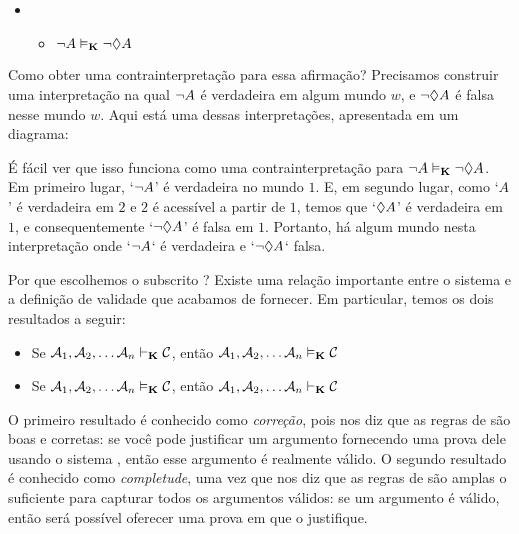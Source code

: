 \begin{itemize}
	\item[]
	      \begin{itemize}
		      \item[]$\neg A\vDash_{\mathbf{K}} \neg \Diamond A$
	      \end{itemize}
\end{itemize}
Como obter uma contrainterpretação para essa afirmação? Precisamos construir uma interpretação na qual $\neg A$ é verdadeira em algum mundo $w$, e $\neg\Diamond A$ é falsa   nesse mundo $w$. Aqui está uma dessas interpretações, apresentada em um diagrama:
\begin{center}
\end{center}
É fácil ver que isso funciona como uma contrainterpretação para  $\neg A\vDash_{\mathbf{K}}\neg\Diamond A$. Em primeiro lugar, `$\neg A$' é verdadeira no mundo $1$. 
E, em segundo lugar, como `$A$' é verdadeira em $2$ e $2$ é acessível a partir de $1$, temos que `$\Diamond A$' é verdadeira em $1$, e consequentemente `$\neg\Diamond A$'   é falsa em $1$. 
Portanto, há algum mundo nesta interpretação onde `$\neg A$` é verdadeira e `$\neg\Diamond A$`  falsa.  

Por que escolhemos o subscrito \mlK? Existe uma relação importante entre o sistema \mlK{} e a definição de validade que acabamos de fornecer. Em particular, temos os dois resultados a seguir:
\begin{itemize}
	\item Se $\mathcal{A}_1,\mathcal{A}_2, \dots \mathcal{A}_n\vdash_{\mathbf{K}}\mathcal{C}$, então $\mathcal{A}_1,\mathcal{A}_2, \dots \mathcal{A}_n\vDash_{\mathbf{K}}\mathcal{C}$
	\item Se $\mathcal{A}_1,\mathcal{A}_2, \dots \mathcal{A}_n\vDash_{\mathbf{K}}\mathcal{C}$, então $\mathcal{A}_1,\mathcal{A}_2, \dots \mathcal{A}_n\vdash_{\mathbf{K}}\mathcal{C}$
\end{itemize}
O primeiro resultado é conhecido como \emph{correção}, pois nos diz que as regras de \mlK{} são boas e corretas: se você pode justificar um argumento fornecendo uma prova dele usando o sistema \mlK, então esse argumento é realmente válido. O segundo resultado é conhecido como    \emph{completude}, uma vez que nos diz que as regras de \mlK{} são amplas o suficiente para capturar todos os argumentos válidos: se um argumento é válido, então será possível oferecer uma prova em \mlK{} que o justifique.
 

